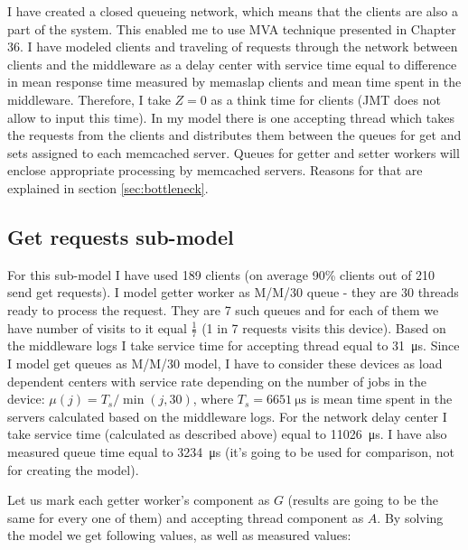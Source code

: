 \documentclass[11pt]{article}
\begin{document}

I have created a closed queueing network, which means that the clients are also a part of the system. This enabled me to use MVA technique presented in Chapter 36. I have modeled clients and traveling of requests through the network between clients and the middleware as a delay center with service time equal to difference in mean response time measured by memaslap clients and mean time spent in the middleware. Therefore, I take $Z=0$ as a think time for clients (JMT does not allow to input this time). In my model there is one accepting thread which takes the requests from the clients and distributes them between the queues for get and sets assigned to each memcached server. 
Queues for getter and setter workers will enclose appropriate processing by memcached servers. Reasons for that are explained in section \ref{sec:bottleneck}.

\subsection{Get requests sub-model}

For this sub-model I have used 189 clients (on average 90\% clients out of 210 send get requests). I model getter worker as M/M/30 queue - they are 30 threads ready to process the request. They are 7 such queues and for each of them we have number of visits to it equal $\frac{1}{7}$ (1 in 7 requests visits this device).
Based on the middleware logs I take service time for accepting thread equal to \SI{31}{\micro\second}.
Since I model get queues as M/M/30 model, I have to consider these devices as load dependent centers with service rate depending on the number of jobs in the device: $\mu(j) = T_s / \min(j, 30)$, where $T_s = \SI{6651}{\micro\second}$
is mean time spent in the servers calculated based on the middleware logs. 
For the network delay center I take service time (calculated as described above) equal to \SI{11026}{\micro\second}.
I have also measured queue time equal to \SI{3234}{\micro\second} (it's going to be used for comparison, not for creating the model).

Let us mark each getter worker's component as $G$ (results are going to be the same for every one of them) and accepting thread component as $A$. By solving the model we get following values, as well as measured values:
\end{document}
